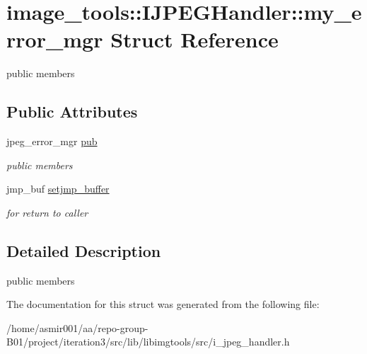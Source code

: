 \hypertarget{structimage__tools_1_1IJPEGHandler_1_1my__error__mgr}{}\section{image\+\_\+tools\+:\+:I\+J\+P\+E\+G\+Handler\+:\+:my\+\_\+error\+\_\+mgr Struct Reference}
\label{structimage__tools_1_1IJPEGHandler_1_1my__error__mgr}


public members  


\subsection*{Public Attributes}
\begin{DoxyCompactItemize}
\item 
jpeg\+\_\+error\+\_\+mgr \hyperlink{structimage__tools_1_1IJPEGHandler_1_1my__error__mgr_a694c7e412f46360915c5fb04177be3d1}{pub}\hypertarget{structimage__tools_1_1IJPEGHandler_1_1my__error__mgr_a694c7e412f46360915c5fb04177be3d1}{}\label{structimage__tools_1_1IJPEGHandler_1_1my__error__mgr_a694c7e412f46360915c5fb04177be3d1}

\begin{DoxyCompactList}\small\item\em public members \end{DoxyCompactList}\item 
jmp\+\_\+buf \hyperlink{structimage__tools_1_1IJPEGHandler_1_1my__error__mgr_a04d55d4d48759139292dd8ddfdd66b72}{setjmp\+\_\+buffer}\hypertarget{structimage__tools_1_1IJPEGHandler_1_1my__error__mgr_a04d55d4d48759139292dd8ddfdd66b72}{}\label{structimage__tools_1_1IJPEGHandler_1_1my__error__mgr_a04d55d4d48759139292dd8ddfdd66b72}

\begin{DoxyCompactList}\small\item\em for return to caller \end{DoxyCompactList}\end{DoxyCompactItemize}


\subsection{Detailed Description}
public members 

The documentation for this struct was generated from the following file\+:\begin{DoxyCompactItemize}
\item 
/home/asmir001/aa/repo-\/group-\/\+B01/project/iteration3/src/lib/libimgtools/src/i\+\_\+jpeg\+\_\+handler.\+h\end{DoxyCompactItemize}
